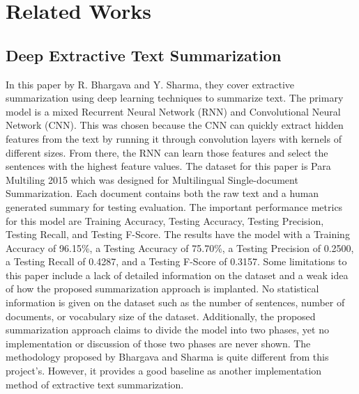 \documentclass{IEEEtran}
\begin{document}
\section{Related Works}
\subsection{Deep Extractive Text Summarization \cite{related_work_1}}
In this paper by R. Bhargava and Y. Sharma, they cover extractive summarization using deep learning techniques to summarize text. The primary model is a mixed Recurrent Neural Network (RNN) and Convolutional Neural Network (CNN). This was chosen because the CNN can quickly extract hidden features from the text by running it through convolution layers with kernels of different sizes. From there, the RNN can learn those features and select the sentences with the highest feature values. The dataset for this paper is Para Multiling 2015 which was designed for Multilingual Single-document Summarization. Each document contains both the raw text and a human generated summary for testing evaluation. The important performance metrics for this model are Training Accuracy, Testing Accuracy, Testing Precision, Testing Recall, and Testing F-Score. The results have the model with a Training Accuracy of 96.15\%, a Testing Accuracy of 75.70\%, a Testing Precision of 0.2500, a Testing Recall of 0.4287, and a Testing F-Score of 0.3157. Some limitations to this paper include a lack of detailed information on the dataset and a weak idea of how the proposed summarization approach is implanted. No statistical information is given on the dataset such as the number of sentences, number of documents, or vocabulary size of the dataset. Additionally, the proposed summarization approach claims to divide the model into two phases, yet no implementation or discussion of those two phases are never shown. The methodology proposed by Bhargava and Sharma is quite different from this project's. However, it provides a good baseline as another implementation method of extractive text summarization.
\end{document}
